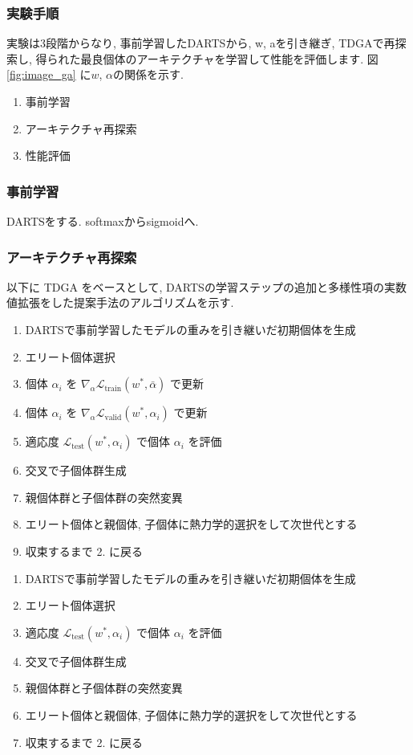 \subsubsection{実験手順}
実験は3段階からなり, 事前学習したDARTSから, w, aを引き継ぎ, TDGAで再探索し, 得られた最良個体のアーキテクチャを学習して性能を評価します.
図 \ref{fig:image_ga} に$w$, $\alpha$の関係を示す.

\begin{enumerate}
  \item 事前学習
  \item アーキテクチャ再探索
  \item 性能評価
\end{enumerate}

\subsubsection{事前学習}
DARTSをする.
softmaxからsigmoidへ.


\subsubsection{アーキテクチャ再探索}

以下に TDGA をベースとして, DARTSの学習ステップの追加と多様性項の実数値拡張をした提案手法のアルゴリズムを示す.

\begin{enumerate}
  \item DARTSで事前学習したモデルの重みを引き継いだ初期個体を生成
  \item エリート個体選択
  \item 個体 $\alpha_i$ を $\displaystyle \nabla_\alpha \mathcal{L}_{\mathrm{train}}(w^*, \bar{\alpha})$ で更新
  \item 個体 $\alpha_i$ を $\displaystyle \nabla_\alpha \mathcal{L}_{\mathrm{valid}}(w^*, \alpha_i)$ で更新
  \item 適応度 $\displaystyle \mathcal{L}_{\mathrm{test}}(w^*, \alpha_i)$ で個体 $\alpha_i$ を評価
  \item 交叉で子個体群生成
  \item 親個体群と子個体群の突然変異
  \item エリート個体と親個体, 子個体に熱力学的選択をして次世代とする
  \item 収束するまで 2. に戻る
\end{enumerate}


\begin{enumerate}
  \item DARTSで事前学習したモデルの重みを引き継いだ初期個体を生成
  \item エリート個体選択
  \item 適応度 $\displaystyle \mathcal{L}_{\mathrm{test}}(w^*, \alpha_i)$ で個体 $\alpha_i$ を評価
  \item 交叉で子個体群生成
  \item 親個体群と子個体群の突然変異
  \item エリート個体と親個体, 子個体に熱力学的選択をして次世代とする
  \item 収束するまで 2. に戻る
\end{enumerate}


